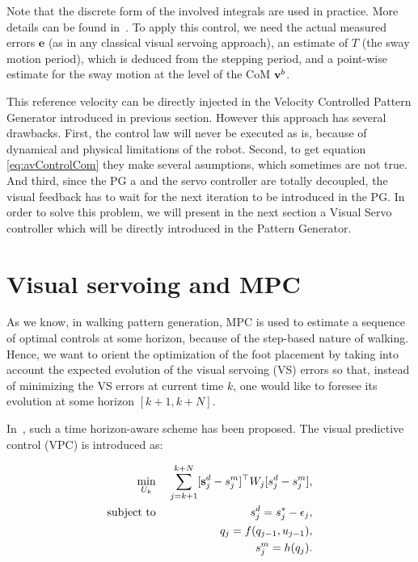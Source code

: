 Note that the discrete form of the involved integrals are used in practice. More details can be found in~\citep{DuneIROS2010}. To apply this control, we need the actual measured errors $\mathbf e$ (as in any classical visual servoing approach), an estimate of $T$ (the sway motion period), which is deduced from the stepping period, and a point-wise estimate for the sway motion at the level of the CoM $\text{\bf v}^b$.

This reference velocity can be directly injected in the Velocity Controlled Pattern Generator introduced in previous section. However this approach has several drawbacks. First, the control law will never be executed as is, because of dynamical and physical limitations of the robot. Second, to get equation \ref{eq:avControlCom} they make several asumptions, which sometimes are not true. And third, since the PG a and the servo controller are totally decoupled, the visual feedback has to wait for the next iteration to be introduced in the PG. In order to solve this problem, we will present in the next section a Visual Servo controller which will be directly introduced in the Pattern Generator.

\section{Visual servoing and MPC}
\label{sec:vsmauricio}

As we know, in walking pattern generation, MPC is used to estimate a sequence of optimal controls at some horizon, because of the step-based nature of walking. Hence, we want to orient the optimization of the foot placement by taking into account the expected evolution of the visual servoing (VS) errors so that, instead of minimizing the VS errors at current time $k$, one would like to foresee its evolution at some horizon $[k+1,k+N]$. 

In~\citep{Allibert2010}, such a time horizon-aware scheme has been proposed. The visual predictive control (VPC) is introduced as:

\begin{eqnarray}
\label{Eq:MinVisualFeatures}
 \min_{U_{k}} \;&& \sum\limits_{j=k+1}^{k+N} [\mathbf s^d_j - s^m_j]^{\top} W_j [s^d_j - s^m_j], \\
 \mbox{subject to} \; && s^d_j = s^{*}_j - \epsilon_j, \\
 \label{Eq:ConstraintDynamicModel}
 && q_j = f(q_{j-1},u_{j-1}), \\
 \label{Eq:ConstraintProjection}
 && s^m_j = h(q_j).
\end{eqnarray}

